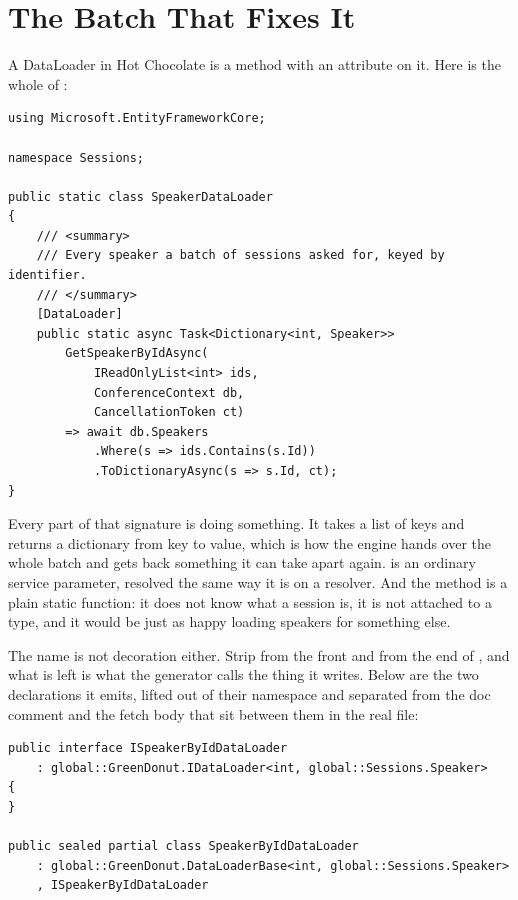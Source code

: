 \section{The Batch That Fixes It}
\label{sec:ch03-the-batch-that-fixes-it}

%
A DataLoader in Hot Chocolate is a method with an attribute on it. Here is the
whole of :

\begin{verbatim}
using Microsoft.EntityFrameworkCore;

namespace Sessions;

public static class SpeakerDataLoader
{
    /// <summary>
    /// Every speaker a batch of sessions asked for, keyed by identifier.
    /// </summary>
    [DataLoader]
    public static async Task<Dictionary<int, Speaker>>
        GetSpeakerByIdAsync(
            IReadOnlyList<int> ids,
            ConferenceContext db,
            CancellationToken ct)
        => await db.Speakers
            .Where(s => ids.Contains(s.Id))
            .ToDictionaryAsync(s => s.Id, ct);
}
\end{verbatim}

%
Every part of that signature is doing something. It takes a list of keys and
returns a dictionary from key to value, which is how the engine hands over the
whole batch and gets back something it can take apart again.
 is an ordinary service parameter, resolved the same
way it is on a resolver. And the method is a plain static function: it does not
know what a session is, it is not attached to a type, and it would be just as
happy loading speakers for something else.

%
The name is not decoration either. Strip  from the front and
 from the end of , and what is left is
what the generator calls the thing it writes. Below are the two declarations it
emits, lifted out of their namespace and separated from the doc comment and the
fetch body that sit between them in the real file:

\begin{verbatim}
public interface ISpeakerByIdDataLoader
    : global::GreenDonut.IDataLoader<int, global::Sessions.Speaker>
{
}

public sealed partial class SpeakerByIdDataLoader
    : global::GreenDonut.DataLoaderBase<int, global::Sessions.Speaker>
    , ISpeakerByIdDataLoader
\end{verbatim}

